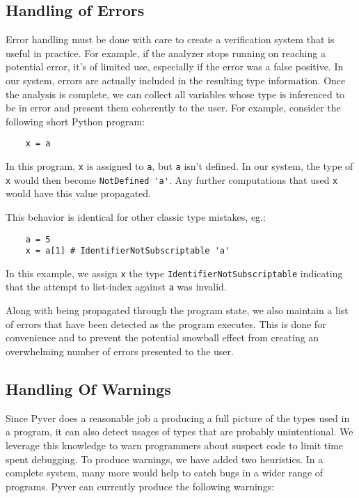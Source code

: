 \documentclass{article}[12pt]
\begin{document}
\subsection{Handling of Errors}

Error handling must be done with care to create a verification system that is useful in practice.
For example, if the analyzer stops running on reaching a potential error, it's of limited use,
especially if the error was a false positive. In our system, errors are actually included in the
resulting type information. Once the analysis is complete, we can collect all variables whose type
is inferenced to be in error and present them coherently to the user. For example, consider the
following short Python program:

\begin{verbatim}
    x = a
\end{verbatim}
In this program, \verb=x= is assigned to \verb=a=, but \verb=a= isn't defined. In our system, the type of
\verb=x= would then become \verb=NotDefined 'a'=. Any further computations that used \verb=x= would
have this value propagated.

This behavior is identical for other classic type mistakes, eg.:
\begin{verbatim}
    a = 5
    x = a[1] # IdentifierNotSubscriptable 'a'
\end{verbatim}
In this example, we assign \verb=x= the type \texttt{IdentifierNotSubscriptable} indicating that the attempt to
list-index against \texttt{a} was invalid.

Along with being propagated through the program state, we also maintain a list of errors that have been detected as the
program executes. This is done for convenience and to prevent the potential snowball effect from creating an overwhelming number of
errors presented to the user.

\subsection{Handling Of Warnings}
Since Pyver does a reasonable job a producing a full picture of the types used in a program, it
can also detect usages of types that are probably unintentional. We leverage this knowledge to warn
programmers about suspect code to limit time spent debugging. To produce warnings, we have added two
heuristics. In a complete system, many more would
help to catch bugs in a wider range of programs. Pyver can currently produce the following warnings:
\end{document}
